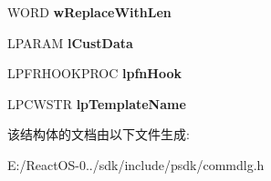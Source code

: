 \begin{DoxyCompactItemize}
W\+O\+RD {\bfseries w\+Replace\+With\+Len}
\item 
\mbox{\label{struct_f_i_n_d_r_e_p_l_a_c_e_w_af9d1755f6305d684953cb934d01d3d1e}} 
L\+P\+A\+R\+AM {\bfseries l\+Cust\+Data}
\item 
\mbox{\label{struct_f_i_n_d_r_e_p_l_a_c_e_w_a5f88f53f1724bfea3a1cd435a86b10db}} 
L\+P\+F\+R\+H\+O\+O\+K\+P\+R\+OC {\bfseries lpfn\+Hook}
\item 
\mbox{\label{struct_f_i_n_d_r_e_p_l_a_c_e_w_a36a9cc5a1dd78f8014d4dac7207b2d87}} 
L\+P\+C\+W\+S\+TR {\bfseries lp\+Template\+Name}
\end{DoxyCompactItemize}


该结构体的文档由以下文件生成\+:\begin{DoxyCompactItemize}
\item 
E\+:/\+React\+O\+S-\/0../sdk/include/psdk/commdlg.\+h\end{DoxyCompactItemize}
